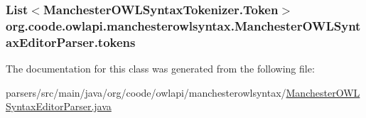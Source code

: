 \hypertarget{classorg_1_1coode_1_1owlapi_1_1manchesterowlsyntax_1_1_manchester_o_w_l_syntax_editor_parser_a50bb487054a703356de7e2199b174222}{
\subsubsection[{tokens}]{\setlength{\rightskip}{0pt plus 5cm}List$<$Manchester\-O\-W\-L\-Syntax\-Tokenizer.\-Token$>$ org.\-coode.\-owlapi.\-manchesterowlsyntax.\-Manchester\-O\-W\-L\-Syntax\-Editor\-Parser.\-tokens\hspace{0.3cm}{\ttfamily [private]}}}\label{classorg_1_1coode_1_1owlapi_1_1manchesterowlsyntax_1_1_manchester_o_w_l_syntax_editor_parser_a50bb487054a703356de7e2199b174222}


The documentation for this class was generated from the following file\-:\begin{DoxyCompactItemize}
\item 
parsers/src/main/java/org/coode/owlapi/manchesterowlsyntax/\hyperlink{_manchester_o_w_l_syntax_editor_parser_8java}{Manchester\-O\-W\-L\-Syntax\-Editor\-Parser.\-java}\end{DoxyCompactItemize}
